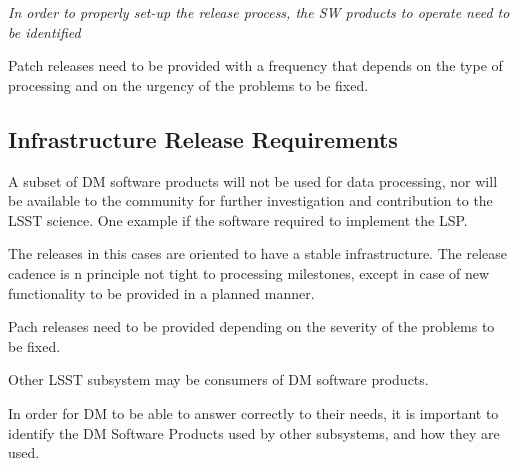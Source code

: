 \textit{In order to properly set-up the release process, the \gls{SW} products to operate need to be identified}

Patch releases need to be provided with a frequency that depends on the type of processing
and on the urgency of the problems to be fixed.


\subsection{Infrastructure Release Requirements} \label{sec:infreqs}

A subset of \gls{DM} software products will not be used for data processing,
nor will be available to the community for further investigation and contribution to the \gls{LSST} science.
One example if the software required to implement the \gls{LSP}.

The releases in this cases are oriented to have a stable infrastructure.
The release cadence is n principle not tight to processing milestones,
except in case of new functionality to be provided in a planned manner.

Pach releases need to be provided depending on the severity of the problems to be fixed.



Other \gls{LSST} subsystem may be consumers of \gls{DM} software products.

In order for \gls{DM} to be able to answer correctly to their needs,
it is important to identify the \gls{DM} Software Products used by other subsystems,
and how they are used.


